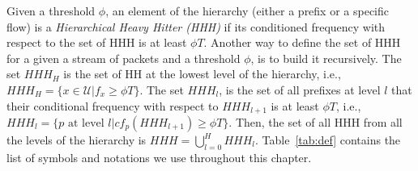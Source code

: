 Given a threshold $\phi$, an element of the hierarchy (either a prefix or a specific flow) is a \textit{Hierarchical Heavy Hitter (HHH)} if its conditioned frequency with respect to the set of HHH  is at least $\phi T$.  Another way to define the set of HHH for a given a stream of packets and a threshold $\phi$, is to build it recursively. The set $HHH_H$ is the set of HH at the lowest level of the hierarchy, i.e., $HHH_H=\{x\in \mathcal U| f_x \geq \phi T\}$. The set $HHH_l$, is the set of all prefixes at level $l$ that their conditional frequency with respect to $HHH_{l+1}$ is at least $\phi T$, i.e., $HHH_l=\{p \text{ at level } l | cf_p(HHH_{l+1}) \geq \phi T\}$. Then, the set of all HHH from all the levels of the hierarchy is $HHH=\bigcup_{l=0}^{H}HHH_l$.
 Table~\ref{tab:def} contains the list of symbols and notations we use throughout this chapter.
\begin{table}[ht]
	\caption{A list of symbols and notations}
	\label{tab:def}
\end{table}
